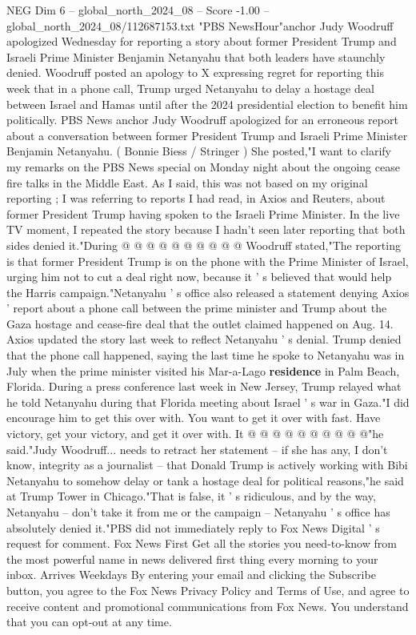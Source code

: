 \begin{textsample}{NEG Dim 6 – global\_north\_2024\_08 – Score -1.00 – global\_north\_2024\_08/112687153.txt}  \label{ex:f6_neg_161}
"PBS NewsHour"anchor Judy Woodruff apologized Wednesday for reporting a story about former President Trump and Israeli Prime Minister Benjamin Netanyahu that both leaders have staunchly denied.
Woodruff posted an apology to X expressing regret for reporting this week that in a phone call, Trump urged Netanyahu to delay a hostage deal between Israel and Hamas until after the 2024 presidential election to benefit him politically.
PBS News anchor Judy Woodruff apologized for an erroneous report about a conversation between former President Trump and Israeli Prime Minister Benjamin Netanyahu. ( Bonnie Biess / Stringer ) She posted,"I want to clarify my remarks on the PBS News special on Monday night about the ongoing cease fire talks in the Middle East.
As I said, this was not based on my original reporting ; I was referring to reports I had read, in Axios and Reuters, about former President Trump having spoken to the Israeli Prime Minister.
In the live TV moment, I repeated the story because I hadn't seen later reporting that both sides denied it."During @ @ @ @ @ @ @ @ @ @ Woodruff stated,"The reporting is that former President Trump is on the phone with the Prime Minister of Israel, urging him not to cut a deal right now, because it ' s believed that would help the Harris campaign."Netanyahu ' s office also released a statement denying Axios ' report about a phone call between the prime minister and Trump about the Gaza hostage and cease-fire deal that the outlet claimed happened on Aug. 14.
Axios updated the story last week to reflect Netanyahu ' s denial.
Trump denied that the phone call happened, saying the last time he spoke to Netanyahu was in July when the prime minister visited his Mar-a-Lago \textbf{residence} in Palm Beach, Florida.
During a press conference last week in New Jersey, Trump relayed what he told Netanyahu during that Florida meeting about Israel ' s war in Gaza."I did encourage him to get this over with.
You want to get it over with fast.
Have victory, get your victory, and get it over with.
It @ @ @ @ @ @ @ @ @ @"he said."Judy Woodruff... needs to retract her statement -- if she has any, I don't know, integrity as a journalist -- that Donald Trump is actively working with Bibi Netanyahu to somehow delay or tank a hostage deal for political reasons,"he said at Trump Tower in Chicago."That is false, it ' s ridiculous, and by the way, Netanyahu -- don't take it from me or the campaign -- Netanyahu ' s office has absolutely denied it."PBS did not immediately reply to Fox News Digital ' s request for comment.
Fox News First Get all the stories you need-to-know from the most powerful name in news delivered first thing every morning to your inbox.
Arrives Weekdays By entering your email and clicking the Subscribe button, you agree to the Fox News Privacy Policy and Terms of Use, and agree to receive content and promotional communications from Fox News.
You understand that you can opt-out at any time.

\end{textsample}
